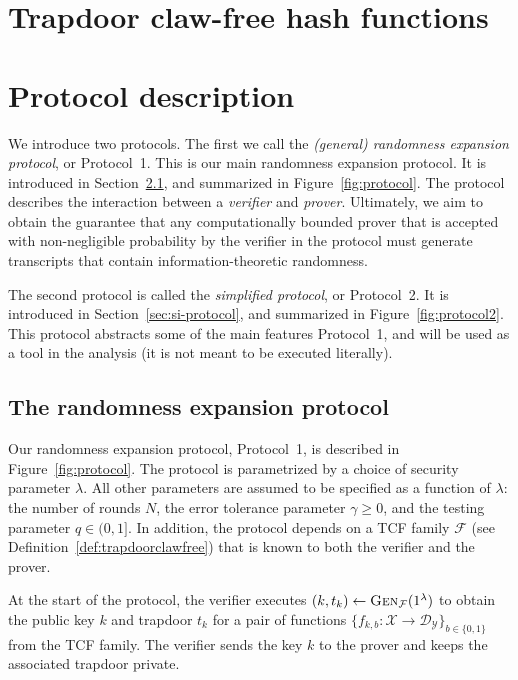 \documentclass[11pt]{article}
\theoremstyle{remark}
\theoremstyle{definition}
\newcommand{\mD}{\ensuremath{\mathcal{D}}}
\newcommand{\mF}{\ensuremath{\mathcal{F}}}
\newcommand{\mX}{\ensuremath{\mathcal{X}}}
\newcommand{\mY}{\ensuremath{\mathcal{Y}}}
\newcommand{\Gen}{\textsc{Gen}}
\begin{document}
\section{Trapdoor claw-free hash functions}
\label{sec:tcf}



\section{Protocol description}
\label{sec:protocol}

We introduce two protocols. The first we call the \emph{(general) randomness expansion protocol}, or Protocol~1. This is our main randomness expansion protocol. It is introduced in Section~\ref{sec:re-protocol}, and summarized in Figure~\ref{fig:protocol}. The protocol describes the interaction between a \emph{verifier} and \emph{prover}. Ultimately, we aim to obtain the guarantee that any computationally bounded prover that is accepted with non-negligible probability by the verifier in the protocol must generate transcripts that contain information-theoretic randomness. 

The second protocol is called the \emph{simplified protocol}, or Protocol~2. It is introduced in Section~\ref{sec:si-protocol}, and summarized in Figure~\ref{fig:protocol2}. This protocol abstracts some of the main features Protocol~1, and will be used as a tool in the analysis (it is not meant to be executed literally).  


\subsection{The randomness expansion protocol}
\label{sec:re-protocol}

Our randomness expansion protocol, Protocol~1, is described in Figure~\ref{fig:protocol}. The protocol is parametrized by a choice of security parameter $\lambda$. All other parameters are assumed to be specified as a function of $\lambda$: the number of rounds $N$, the error tolerance parameter $\gamma \geq 0$, and the testing parameter $q\in (0,1]$. In addition, the protocol depends on a TCF family $\mathcal{F}$ (see Definition~\ref{def:trapdoorclawfree}) that is known to both the verifier and the prover.

At the start of the protocol, the verifier executes $(k,t_k)\leftarrow \Gen_\mF(1^\lambda)$ to obtain the public key $k$ and trapdoor $t_k$ for a pair of functions $\{f_{k,b}:\mX\to \mD_\mY\}_{b\in\{0,1\}}$ from the TCF family. The verifier sends the key $k$ to the prover and keeps the associated trapdoor private. 
\end{document}
